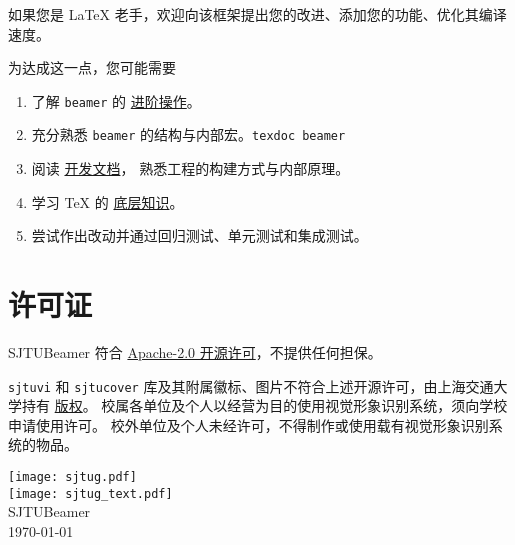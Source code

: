 \documentclass[
    UTF8,
    heading=true,
    12pt,
    a4paper
]{ctexrep}
\def\themename{\textsf{SJTUBeamer}}
\begin{document}
如果您是 \LaTeX{} 老手，欢迎向该框架提出您的改进、添加您的功能、优化其编译速度。

为达成这一点，您可能需要
\begin{enumerate}
  \item 了解 \texttt{beamer}
        的 \href{https://latex-beamer.com/}{进阶操作}。
  \item 充分熟悉 \texttt{beamer}
        的结构与内部宏。\texttt{texdoc beamer}
  \item 阅读
        \href{run:sjtubeamerdevguide.pdf}{开发文档}，
        熟悉工程的构建方式与内部原理。
  \item 学习 \TeX{} 的
        \href{https://mirrors.sjtug.sjtu.edu.cn/
          CTAN/graphics/pgf/contrib/pgfplots/
          doc/TeX-programming-notes.pdf}{底层知识}。
  \item 尝试作出改动并通过回归测试、单元测试和集成测试。
\end{enumerate}

\chapter*{许可证}

\themename{} 符合
\href{https://github.com/sjtug/SJTUBeamer/blob/ma
  in/LICENSE}{Apache-2.0 开源许可}，不提供任何担保。

\texttt{sjtuvi} 和 \texttt{sjtucover}
库及其附属徽标、图片不符合上述开源许可，由上海交通大学持有
\href{https://vi.sjtu.edu.cn/index.php/articles/b
  ulletin/16}{版权}。
校属各单位及个人以经营为目的使用视觉形象识别系统，须向学校申请使用许可。
校外单位及个人未经许可，不得制作或使用载有视觉形象识别系统的物品。

\def\sjtuglogo{
  \texttt{[image: sjtug.pdf]}\\
  \vspace*{5pt}
  \texttt{[image: sjtug\_text.pdf]}
}

\vfill
{
\centering
\sjtuglogo\\
{\large \themename{}\\}
\today\\
}
\vfill
\end{document}
